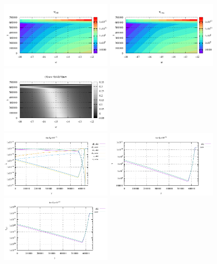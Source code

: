 \begin{itemize}
\begin{center}
\includegraphics[width=5.5cm]{images/rheology/example/map_tau_old-1}
\includegraphics[width=5.5cm]{images/rheology/example/map_tau_new-1}
\includegraphics[width=5.5cm]{images/rheology/example/map_tau_diff-1}\\
\includegraphics[width=5.5cm]{images/rheology/example/profile_sr-1}
\includegraphics[width=5.5cm]{images/rheology/example/profile_tau-1}
\includegraphics[width=5.5cm]{images/rheology/example/profile_etaeff-1}\\

\end{center}
\end{itemize}
